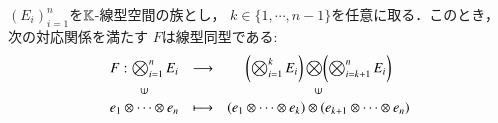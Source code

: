 	\begin{screen}
		\begin{thm}[結合律]
		\label{thm:associativity_of_tensor_products}
			$(E_i)_{i=1}^n$を$\mathbb{K}$-線型空間の族とし，
			$k \in \{ 1,\cdots,n-1 \}$を任意に取る．このとき，次の対応関係を満たす
			$F$は線型同型である:
			\begin{align}
				\begin{array}{ccc}
					F:\bigotimes_{i=1}^n E_i & \longrightarrow & \biggl( \bigotimes_{i=1}^k E_i \biggr) \bigotimes \biggl( \bigotimes_{i=k+1}^n E_i \biggr) \\
					\rotatebox{90}{$\in$} & & \rotatebox{90}{$\in$} \\
					e_1 \otimes \cdots \otimes e_n & \longmapsto & (e_1 \otimes \cdots \otimes e_k) \otimes (e_{k+1} \otimes \cdots \otimes e_n)
				\end{array}
			\end{align}
		\end{thm}
	\end{screen}
	
